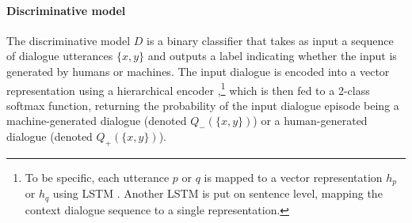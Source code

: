 \documentclass[11pt]{article}
\begin{document}
\paragraph{Discriminative model} The discriminative model $D$ is a binary classifier that takes as input a sequence of dialogue utterances $\{x,y\}$
 and outputs a label indicating whether the input is generated by humans or machines.  
The input dialogue is encoded into a vector representation 
using a hierarchical encoder  \cite{li2015hierarchical,serban2016building},\footnote{To be specific, each utterance $p$ or $q$ is mapped to a vector representation $h_p$ or $h_q$ using LSTM \cite{hochreiter1997long}.
Another LSTM is put on sentence level, mapping the context dialogue sequence to a single representation.} which is then fed to a 2-class softmax function, returning the probability of the input dialogue episode being a machine-generated dialogue
(denoted $Q_-(\{x,y\})$)
 or a human-generated dialogue  (denoted $Q_+(\{x,y\})$). 
\end{document}
